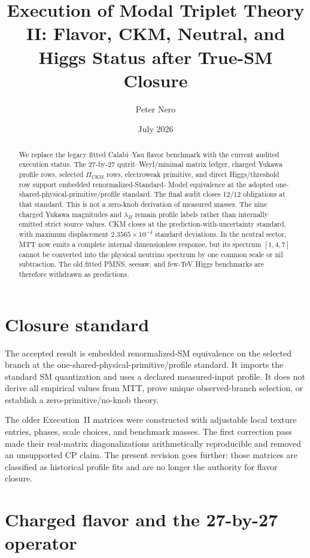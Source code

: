 \documentclass[11pt]{article}
\title{Execution of Modal Triplet Theory II:
Flavor, CKM, Neutral, and Higgs Status after True-SM Closure}
\author{Peter Nero}
\date{July 2026}
\begin{document}
\maketitle

\begin{abstract}
We replace the legacy fitted Calabi--Yau flavor benchmark with the current
audited execution status. The 27-by-27 qutrit--Weyl/minimal matrix ledger,
charged Yukawa profile rows, selected $\Pi_{\mathrm{CKM}}$ rows, electroweak
primitive, and direct Higgs/threshold row support embedded renormalized-Standard-
Model equivalence at the adopted one-shared-physical-primitive/profile
standard. The final audit closes 12/12 obligations at that standard. This is
not a zero-knob derivation of measured masses. The nine charged Yukawa
magnitudes and $\lambda_H$ remain profile labels rather than internally emitted
strict source values. CKM closes at the prediction-with-uncertainty standard,
with maximum displacement $2.3565\times10^{-4}$ standard deviations. In the
neutral sector, MTT now emits a complete internal dimensionless response, but
its spectrum $[1,4,7]$ cannot be converted into the physical neutrino spectrum
by one common scale or nil subtraction. The old fitted PMNS, seesaw, and
few-TeV Higgs benchmarks are therefore withdrawn as predictions.
\end{abstract}

\section{Closure standard}

The accepted result is embedded renormalized-SM equivalence on the selected
branch at the one-shared-physical-primitive/profile standard. It imports the
standard SM quantization and uses a declared measured-input profile. It does
not derive all empirical values from MTT, prove unique observed-branch
selection, or establish a zero-primitive/no-knob theory.

The older Execution~II matrices were constructed with adjustable local texture
entries, phases, scale choices, and benchmark masses. The first correction pass
made their real-matrix diagonalizations arithmetically reproducible and removed
an unsupported CP claim. The present revision goes further: those matrices are
classified as historical profile fits and are no longer the authority for
flavor closure.

\section{Charged flavor and the 27-by-27 operator}
\end{document}
